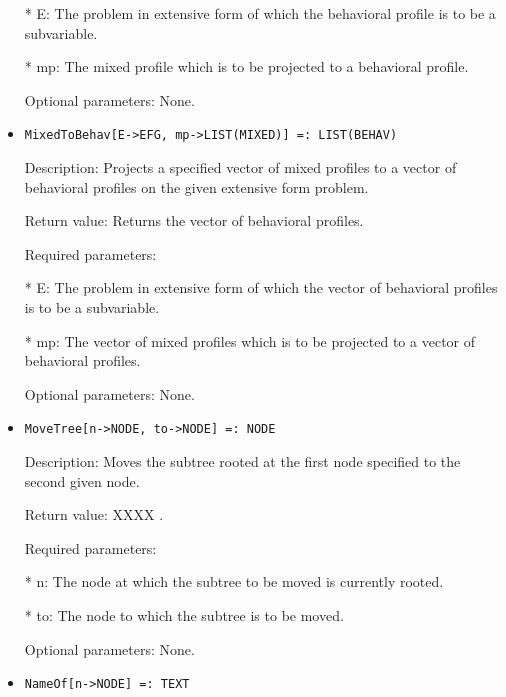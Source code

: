 \begin{itemize}
\bd
\item
[* E:] The problem in extensive form of which the behavioral profile
is to be a subvariable.
\item
[* mp:] The mixed profile which is to be projected to a behavioral
profile.
\ed

\item
[Optional parameters:] None.
\ed

\item
\begin{verbatim}
MixedToBehav[E->EFG, mp->LIST(MIXED)] =: LIST(BEHAV)
\end{verbatim}

\bd
\item
[Description:] Projects a specified vector of mixed profiles to a vector
of behavioral profiles on the given extensive form problem.
\item
[Return value:] Returns the vector of behavioral profiles.
\item
[Required parameters:]\hfil\null

\bd
\item
[* E:] The problem in extensive form of which the vector of 
behavioral profiles is to be a subvariable.
\item
[* mp:] The vector of mixed profiles which is to be projected to a 
vector of behavioral profiles.
\ed

\item
[Optional parameters:] None.
\ed

\item
\begin{verbatim}
MoveTree[n->NODE, to->NODE] =: NODE
\end{verbatim}

\bd
\item
[Description:] Moves the subtree rooted at the first node specified to
the second given node.
\item
[Return value:] XXXX .
\item
[Required parameters:]\hfil\null
	  
\bd
\item
[* n:] The node at which the subtree to be moved is currently rooted.
\item
[* to:] The node to which the subtree is to be moved.
\ed

\item
[Optional parameters:] None.
\ed

\item
\begin{verbatim}
NameOf[n->NODE] =: TEXT
\end{verbatim}


\end{itemize}
